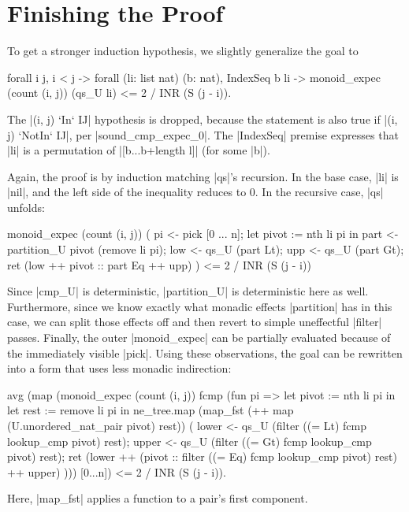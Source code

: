 \documentclass[runningheads]{llncs}
\begin{document}
\section{Finishing the Proof}
\label{finishing}

To get a stronger induction hypothesis, we slightly generalize the goal to
\begin{code}
  forall i j, i < j -> forall (li: list nat) (b: nat), IndexSeq b li ->
    monoid_expec (count (i, j)) (qs_U li) <= 2 / INR (S (j - i)).
\end{code}
The |(i, j) `In` IJ| hypothesis is dropped, because the statement is also true if |(i, j) `NotIn` IJ|, per |sound_cmp_expec_0|. The |IndexSeq| premise expresses that |li| is a permutation of |[b...b+length l]| (for some |b|).

Again, the proof is by induction matching |qs|'s recursion. In the base case, |li| is |nil|, and the left side of the inequality reduces to 0. In the recursive case, |qs| unfolds:
\begin{code}
monoid_expec (count (i, j)) (
    pi <- pick [0 ... n];
    let pivot := nth li pi in
    part <- partition_U pivot (remove li pi);
    low <- qs_U (part Lt);
    upp <- qs_U (part Gt);
    ret (low ++ pivot :: part Eq ++ upp)
  ) <= 2 / INR (S (j - i))
\end{code}
Since |cmp_U| is deterministic, |partition_U| is deterministic here as well. Furthermore, since we know exactly what monadic effects |partition| has in this case, we can split those effects off and then revert to simple uneffectful |filter| passes. Finally, the outer |monoid_expec| can be partially evaluated because of the immediately visible |pick|. Using these observations, the goal can be rewritten into a form that uses less monadic indirection:

\begin{code}
avg (map (monoid_expec (count (i, j)) fcmp (fun pi =>
    let pivot := nth li pi in
    let rest := remove li pi in
    ne_tree.map (map_fst (++ map (U.unordered_nat_pair pivot) rest)) (
      lower <- qs_U (filter ((= Lt) fcmp lookup_cmp pivot) rest);
      upper <- qs_U (filter ((= Gt) fcmp lookup_cmp pivot) rest);
      ret (lower ++ (pivot :: filter ((= Eq) fcmp lookup_cmp pivot) rest) ++ upper)
    ))) [0...n]) <= 2 / INR (S (j - i)).
\end{code}
Here, |map_fst| applies a function to a pair's first component.
\end{document}
